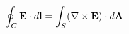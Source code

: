 \documentclass[preview]{standalone}
\begin{document}
\begin{align*}
\special{dvisvgm:raw <g id='unique000'>}\oint_C\mathbf E\cdot d\mathbf l=\int_S(\nabla\times\mathbf E)\cdot d\mathbf A\special{dvisvgm:raw </g>}
\end{align*}
\end{document}
